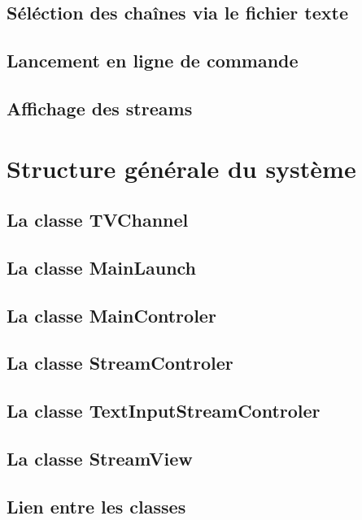 \documentclass{polytech/polytech}
\begin{document}
\subsection{Séléction des chaînes via le fichier texte}

\subsection{Lancement en ligne de commande}

\subsection{Affichage des streams}

\section{Structure générale du système}


\subsection{La classe TVChannel}

\subsection{La classe MainLaunch}

\subsection{La classe MainControler}

\subsection{La classe StreamControler}

\subsection{La classe TextInputStreamControler}

\subsection{La classe StreamView}


\subsection{Lien entre les classes}
\end{document}
